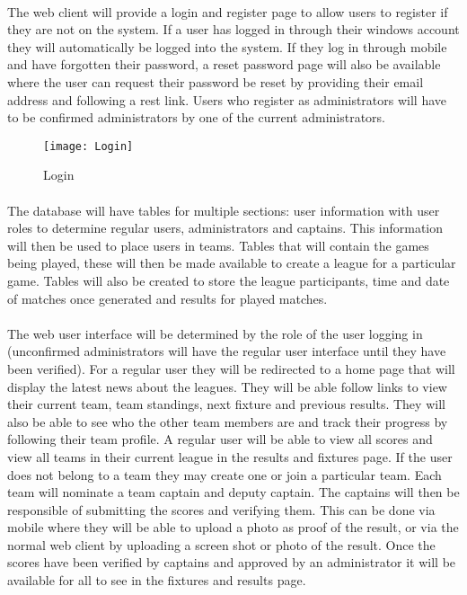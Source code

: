 \documentclass[11pt]{article}
\begin{document}
\paragraph{}
The web client will provide a login and register page to allow users to register if they are not on the system. If a user has logged in through their windows account they will automatically be logged into the system. If they log in through mobile and have forgotten their password, a reset password page will also be available where the user can request their password be reset by providing their email address and following a rest link. Users who register as administrators will have to be confirmed administrators by one of the current administrators.

\begin{figure}[h]
\caption{Login}
\centering
\texttt{[image: Login]}
\end{figure}

\paragraph{}
The database will have tables for multiple sections: user information with user roles to determine regular users, administrators and captains. This information will then be used to place users in teams. Tables that will contain the games being played, these will then be made available to create a league for a particular game. Tables will also be created to store the league participants, time and date of matches once generated and results for played matches.

\paragraph{}
The web user interface will be determined by the role of the user logging in (unconfirmed administrators will have the regular user interface until they have been verified). For a regular user they will be redirected to a home page that will display the latest news about the leagues. They will be able follow links to view their current team, team standings, next fixture and previous results. They will also be able to see who the other team members are and track their progress by following their team profile. A regular user will be able to view all scores and view all teams in their current league in the results and fixtures page. If the user does not belong to a team they may create one or join a particular team. Each team will nominate a team captain and deputy captain. The captains will then be responsible of submitting the scores and verifying them. This can be done via mobile where they will be able to upload a photo as proof of the result, or via the normal web client by uploading a screen shot or photo of the result. Once the scores have been verified by captains and approved by an administrator it will be available for all to see in the fixtures and results page.
\end{document}
